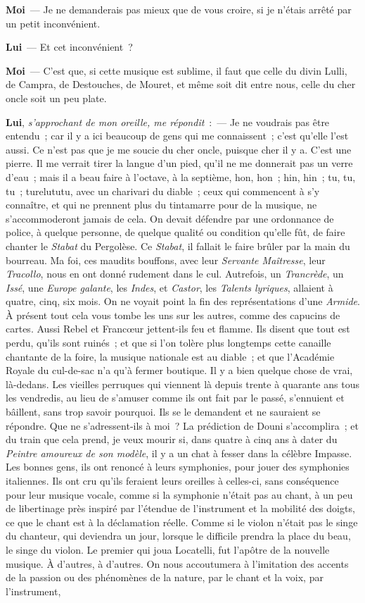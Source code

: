 \documentclass[french,twoside]{book} %
\newcommand{\labelchar}[1]{\textbf{\color{rubric} #1}}
\begin{document}
\labelchar{Moi} — Je ne demanderais pas mieux que de vous croire, si je n’étais arrêté par un petit inconvénient.\par
\labelchar{Lui} — Et cet inconvénient ?\par
\labelchar{Moi} — C’est que, si cette musique est sublime, il faut que celle du divin Lulli, de Campra, de Destouches, de Mouret, et même soit dit entre nous, celle du cher oncle soit un peu plate.\par
\labelchar{Lui}, \emph{s’approchant de mon oreille, me répondit} : — Je ne voudrais pas être entendu ; car il y a ici beaucoup de gens qui me connaissent ; c’est qu’elle l’est aussi. Ce n’est pas que je me soucie du cher oncle, puisque cher il y a. C’est une pierre. Il me verrait tirer la langue d’un pied, qu’il ne me donnerait pas un verre d’eau ; mais il a beau faire à l’octave, à la septième, hon, hon ; hin, hin ; tu, tu, tu ; turelututu, avec un charivari du diable ; ceux qui commencent à s’y connaître, et qui ne prennent plus du tintamarre pour de la musique, ne s’accommoderont jamais de cela. On devait défendre par une ordonnance de police, à quelque personne, de quelque qualité ou condition qu’elle fût, de faire chanter le \emph{Stabat} du Pergolèse. Ce \emph{Stabat}, il fallait le faire brûler par la main du bourreau. Ma foi, ces maudits bouffons, avec leur \emph{Servante Maîtresse}, leur \emph{Tracollo}, nous en ont donné rudement dans le cul. Autrefois, un \emph{Trancrède}, un \emph{Issé}, une \emph{Europe galante}, les \emph{Indes}, et \emph{Castor}, les \emph{Talents lyriques}, allaient à quatre, cinq, six mois. On ne voyait point la fin des représentations d’une \emph{Armide}. À présent tout cela vous tombe les uns sur les autres, comme des capucins de cartes. Aussi Rebel et Francœur jettent-ils feu et flamme. Ils disent que tout est perdu, qu’ils sont ruinés ; et que si l’on tolère plus longtemps cette canaille chantante de la foire, la musique nationale est au diable ; et que l’Académie Royale du cul-de-sac n’a qu’à fermer boutique. Il y a bien quelque chose de vrai, là-dedans. Les vieilles perruques qui viennent là depuis trente à quarante ans tous les vendredis, au lieu de s’amuser comme ils ont fait par le passé, s’ennuient et bâillent, sans trop savoir pourquoi. Ils se le demandent et ne sauraient se répondre. Que ne s’adressent-ils à moi ? La prédiction de Douni s’accomplira ; et du train que cela prend, je veux mourir si, dans quatre à cinq ans à dater du \emph{Peintre amoureux de son modèle}, il y a un chat à fesser dans la célèbre Impasse. Les bonnes gens, ils ont renoncé à leurs symphonies, pour jouer des symphonies italiennes. Ils ont cru qu’ils feraient leurs oreilles à celles-ci, sans conséquence pour leur musique vocale, comme si la symphonie n’était pas au chant, à un peu de libertinage près inspiré par l’étendue de l’instrument et la mobilité des doigts, ce que le chant est à la déclamation réelle. Comme si le violon n’était pas le singe du chanteur, qui deviendra un jour, lorsque le difficile prendra la place du beau, le singe du violon. Le premier qui joua Locatelli, fut l’apôtre de la nouvelle musique. À d’autres, à d’autres. On nous accoutumera à l’imitation des accents de la passion ou des phénomènes de la nature, par le chant et la voix, par l’instrument, 
\end{document}
